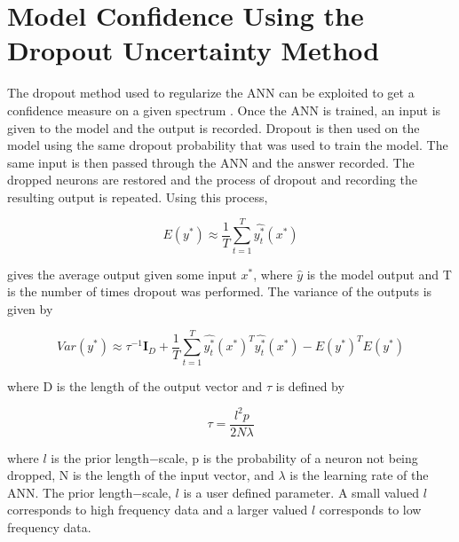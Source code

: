 \documentclass[tocnosub,noragright,centerchapter,12pt,fullpage]{uiucecethesis09}
\begin{document}

\iffalse
\section{Model Confidence Using the Dropout Uncertainty Method} \label{ModelConfidence}

The dropout method used to regularize the ANN can be exploited to get a confidence measure on a given spectrum \cite{Yarin2016}. Once the ANN is trained, an input is given to the model and the output is recorded. Dropout is then used on the model using the same dropout probability that was used to train the model. The same input is then passed through the ANN and the answer recorded. The dropped neurons are restored and the process of dropout and recording the resulting output is repeated. Using this process, 

\begin{equation} \label{eq:update1}
E (y^{*}) \approx \frac{1}{T} \sum^{T}_{t=1} \hat{y^{*}_t} (x^{*})
\end{equation}

gives the average output given some input $x^{*}$, where $\hat{y}$ is the model output and T is the number of times dropout was performed. The variance of the outputs is given by 


\begin{equation} \label{eq:update1}
Var (y^{*}) \approx \tau^{-1} \boldsymbol{I}_D + \frac{1}{T} \sum^{T}_{t=1} \hat{y^{*}_t} (x^{*})^{T} \hat{y^{*}_t}(x^{*}) - E(y^{*})^{T}E(y^{*})
\end{equation}

where D is the length of the output vector and $\tau$ is defined by 

\begin{equation} \label{eq:update1}
\tau = \frac{l^2 p }{2 N \lambda}
\end{equation}

where $l$ is the prior length$-$scale, p is the probability of a neuron not being dropped, N is the length of the input vector, and $\lambda$ is the learning rate of the ANN. The prior length$-$scale, $l$ is a user defined parameter. A small valued $l$ corresponds to high frequency data and a larger valued $l$ corresponds to low frequency data. 
\end{document}
